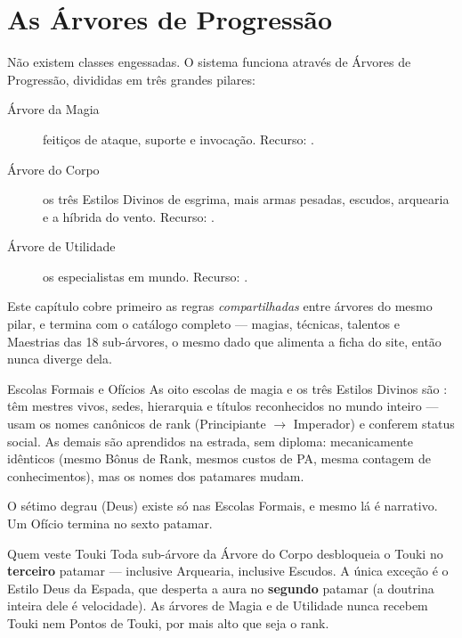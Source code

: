 \chapter{As Árvores de Progressão}

Não existem classes engessadas. O sistema funciona através de Árvores de Progressão,
divididas em três grandes pilares:

\begin{description}
    \item[Árvore da Magia] feitiços de ataque, suporte e invocação. Recurso: .
    \item[Árvore do Corpo] os três Estilos Divinos de esgrima, mais armas pesadas, escudos,
          arquearia e a híbrida do vento. Recurso: .
    \item[Árvore de Utilidade] os especialistas em mundo. Recurso: .
\end{description}

Este capítulo cobre primeiro as regras \emph{compartilhadas} entre árvores do mesmo pilar,
e termina com o catálogo completo --- magias, técnicas, talentos e Maestrias das 18
sub-árvores, o mesmo dado que alimenta a ficha do site, então nunca diverge dela.

\begin{nota}{Escolas Formais e Ofícios}
    As oito escolas de magia e os três Estilos Divinos são : têm
    mestres vivos, sedes, hierarquia e títulos reconhecidos no mundo inteiro --- usam os
    nomes canônicos de rank (Principiante $\to$ Imperador) e conferem status social. As
    demais são  aprendidos na estrada, sem diploma: mecanicamente idênticos
    (mesmo Bônus de Rank, mesmos custos de PA, mesma contagem de conhecimentos), mas os
    nomes dos patamares mudam.

    \medskip
    O sétimo degrau (Deus) existe só nas Escolas Formais, e mesmo lá é narrativo. Um Ofício
    termina no sexto patamar.
\end{nota}

\begin{nota}{Quem veste Touki}
    Toda sub-árvore da Árvore do Corpo desbloqueia o Touki no \textbf{terceiro} patamar ---
    inclusive Arquearia, inclusive Escudos. A única exceção é o Estilo Deus da Espada, que
    desperta a aura no \textbf{segundo} patamar (a doutrina inteira dele é velocidade). As
    árvores de Magia e de Utilidade nunca recebem Touki nem Pontos de Touki, por mais alto
    que seja o rank.
\end{nota}

